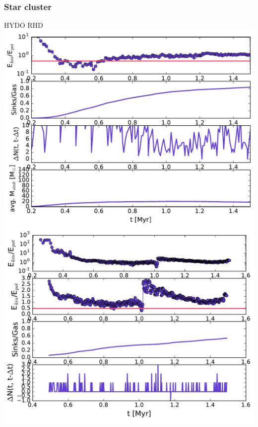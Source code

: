 \documentclass{beamer}
\begin{document}
\begin{frame}
\frametitle{Star cluster}
 \centering
 HYDO \hspace{4cm} RHD\\
 \colorbox{white}{
  \includegraphics[width=0.4\paperwidth]{../Figures/cloud_plots/virial_noRTcloud.pdf}
  \includegraphics[width=0.4\paperwidth]{../Figures/cloud_plots/virial_IRcloud.pdf}
 }
\end{frame}
\end{document}
